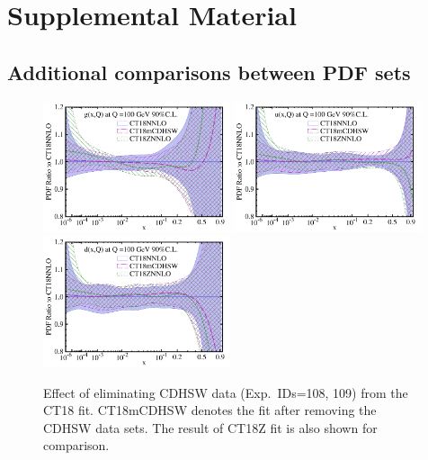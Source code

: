 %
%

\section{Supplemental Material}
\label{sec:Supp}

\subsection{Additional comparisons between PDF sets}
\label{sec:Supp-PDFbands}

\begin{figure}[b]
\hspace*{-1.5cm}
\includegraphics[width=0.49\textwidth]{./fig/SuppMat/pdfs_CT18NNLO_CT18mCDHSW_CT18ZNNLO_100GeV_A90CL__00___glu__pdfr_cus-lin_ect.pdf}
\includegraphics[width=0.49\textwidth]{./fig/SuppMat/pdfs_CT18NNLO_CT18mCDHSW_CT18ZNNLO_100GeV_A90CL__01___uqk__pdfr_cus-lin_ect.pdf}\\
\includegraphics[width=0.49\textwidth]{./fig/SuppMat/pdfs_CT18NNLO_CT18mCDHSW_CT18ZNNLO_100GeV_A90CL__02___dqk__pdfr_cus-lin_ect.pdf}
\caption{Effect of eliminating CDHSW data (Exp.~IDs=108, 109) from the CT18 fit. CT18mCDHSW denotes the fit after removing the CDHSW data sets. The result of CT18Z fit is also shown for comparison. 
\label{fig:cdhsw}}
\end{figure}

